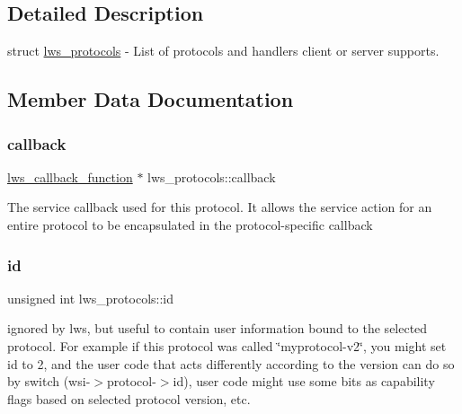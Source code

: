\subsection{Detailed Description}
struct \hyperlink{structlws__protocols}{lws\+\_\+protocols} -\/ List of protocols and handlers client or server supports. 

\subsection{Member Data Documentation}
\mbox{\label{structlws__protocols_a7fd66ba094ac0f54ea8b176264449fef}} 
\subsubsection{\texorpdfstring{callback}{callback}}
{\footnotesize\ttfamily \hyperlink{group__usercb_gad4fcb82e68d60ffacca61a3f783a0a2f}{lws\+\_\+callback\+\_\+function} $\ast$ lws\+\_\+protocols\+::callback}

The service callback used for this protocol. It allows the service action for an entire protocol to be encapsulated in the protocol-\/specific callback \mbox{\label{structlws__protocols_a6b632018590c2b1bbe43fbab6d5e6fac}} 
\subsubsection{\texorpdfstring{id}{id}}
{\footnotesize\ttfamily unsigned int lws\+\_\+protocols\+::id}

ignored by lws, but useful to contain user information bound to the selected protocol. For example if this protocol was called \char`\"{}myprotocol-\/v2\char`\"{}, you might set id to 2, and the user code that acts differently according to the version can do so by switch (wsi-\/$>$protocol-\/$>$id), user code might use some bits as capability flags based on selected protocol version, etc. \mbox{\label{structlws__protocols_af285ada5293641ed6cd74a53fa8bbeb6}} 
